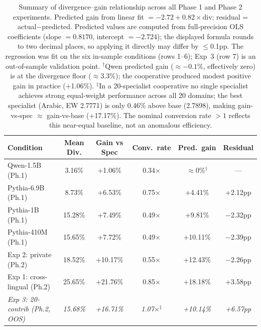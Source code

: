 \documentclass{article}
\begin{document}
\begin{table}[h]
\centering
\caption{Summary of divergence--gain relationship across all Phase 1 and Phase 2 experiments. Predicted gain from linear fit $= -2.72 + 0.82 \times \text{div}$; residual = actual$-$predicted. Predicted values are computed from full-precision OLS coefficients (slope $= 0.8170$, intercept $= -2.724$); the displayed formula rounds to two decimal places, so applying it directly may differ by $\leq$0.1pp. The regression was fit on the six in-sample conditions (rows 1--6); Exp~3 (row 7) is an out-of-sample validation point. $^{\dagger}$Qwen predicted gain ($\approx{-}0.1\%$, effectively zero) is at the divergence floor ($\approx$3.3\%); the cooperative produced modest positive gain in practice (+1.06\%). $^{\ddagger}$In a 20-specialist cooperative no single specialist achieves strong equal-weight performance across all 20 domains; the best specialist (Arabic, EW 2.7771) is only 0.46\% above base (2.7898), making gain-vs-spec $\approx$ gain-vs-base (+17.17\%). The nominal conversion rate $>1$ reflects this near-equal baseline, not an anomalous efficiency.}
\label{tab:divergence_gain}
\small
\begin{tabular}{lccccc}
\toprule
\textbf{Condition} & \textbf{Mean Div.} & \textbf{Gain vs Spec} & \textbf{Conv.\ rate} & \textbf{Pred.\ gain} & \textbf{Residual} \\
\midrule
Qwen-1.5B (Ph.1)            & 3.16\%  & +1.06\%  & 0.34$\times$ & $\approx$0\%$^{\dagger}$ & --- \\
Pythia-6.9B (Ph.1)          & 8.73\%  & +6.53\%  & 0.75$\times$ & +4.41\%  & +2.12pp \\
Pythia-1B (Ph.1)            & 15.28\% & +7.49\%  & 0.49$\times$ & +9.81\%  & $-$2.32pp \\
Pythia-410M (Ph.1)          & 15.65\% & +7.72\%  & 0.49$\times$ & +10.11\% & $-$2.39pp \\
Exp 2: private (Ph.2)       & 18.52\% & +10.17\% & 0.55$\times$ & +12.43\% & $-$2.26pp \\
Exp 1: cross-lingual (Ph.2) & 25.65\% & +21.76\% & 0.85$\times$ & +18.18\% & +3.58pp \\
\midrule
\textit{Exp 3: 20-contrib (Ph.2, OOS)} & \textit{15.68\%} & \textit{+16.71\%} & \textit{1.07$\times$$^{\ddagger}$} & \textit{+10.14\%} & \textit{+6.57pp} \\
\bottomrule
\end{tabular}
\end{table}
\end{document}
